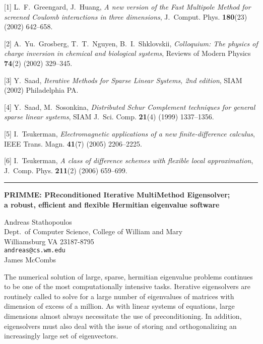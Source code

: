 \documentclass[twosided]{report}
\begin{document}
[1]
L.~F.~Greengard, J.~Huang,
{\em A new version of the {Fast Multipole Method}
for screened {Coulomb} interactions in three
dimensions}, J.~Comput. Phys. {\bf 180}(23)
(2002) 642--658.

[2]
A.~Yu.~Grosberg, T.~T.~Nguyen, B.~I.~Shklovskii,
{\em Colloquium: The physics of charge inversion
in chemical and biological systems},
Reviews of Modern Physics {\bf 74}(2)
(2002) 329--345.

[3]
Y.~Saad, {\em Iterative Methods for Sparse Linear
Systems, 2nd edition}, SIAM (2002) Philadelphia PA.

[4]
Y.~Saad, M.~Sosonkina, {\em Distributed
{Schur Complement} techniques for general sparse
linear systems}, SIAM J.~Sci. Comp. {\bf 21}(4)
(1999) 1337--1356.

[5]
I.~Tsukerman, {\em Electromagnetic applications
of a new finite-difference calculus},
IEEE Trans. Magn. {\bf 41}(7) (2005) 2206--2225.

[6]
I.~Tsukerman, {\em A class of difference schemes with
flexible local approximation}, J.~Comp. Phys.
{\bf 211}(2) (2006) 659--699.



	\begin{center} \rule{6in}{1pt} \end{center}


\begin{center}
{\large			%
{\bf PRIMME: PReconditioned Iterative MultiMethod Eigensolver; \\
	a robust, efficient and flexible Hermitian eigenvalue software}}

	Andreas Stathopoulos \\
	Dept.~of Computer Science, College of William and Mary \\
	Williamsburg VA 23187-8795 \\
	{\tt andreas@cs.wm.edu} \\
	James McCombs
\end{center}
The numerical solution of large, sparse, hermitian
eigenvalue problems continues to be one of the most
computationally intensive tasks. Iterative eigensolvers are
routinely called to solve for a large number of eigenvalues
of matrices with dimension of excess of a million. As with
linear systems of equations, large dimensions almost always
necessitate the use of preconditioning. In addition,
eigensolvers must also deal with the issue of storing and
orthogonalizing an increasingly large set of eigenvectors.
\end{document}
